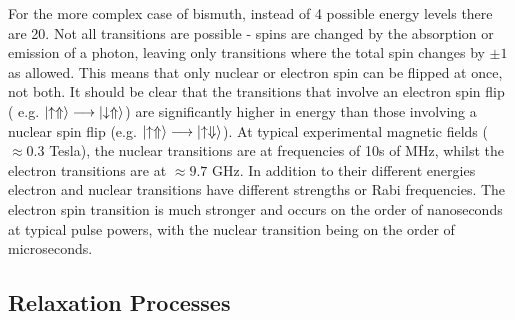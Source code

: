 For the more complex case of bismuth, instead of 4 possible energy levels there are 20. 
Not all transitions are possible - spins are changed by the absorption or emission of a photon, leaving only transitions where the total spin changes by $\pm1$ as allowed.
This means that only nuclear or electron spin can be flipped at once, not both. 
It should be clear that the transitions that involve an electron spin flip ( e.g. $\ket{\uparrow \Uparrow} \longrightarrow \ket{\downarrow \Uparrow}$) are significantly higher in energy than those involving a nuclear spin flip (e.g. $\ket{\uparrow \Uparrow} \longrightarrow \ket{\uparrow \Downarrow}$). 
At typical experimental magnetic fields ($\approx 0.3$ Tesla), the nuclear transitions are at frequencies of 10s of MHz, whilst the electron transitions are at $\approx 9.7$ GHz.
In addition to their different energies electron and nuclear transitions have different strengths or Rabi frequencies. 
The electron spin transition is much stronger and occurs on the order of nanoseconds at typical pulse powers, with the nuclear transition being on the order of microseconds.

\subsection{Relaxation Processes}
\label{sec:relProc}

